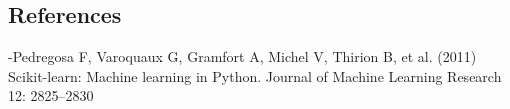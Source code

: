 \documentclass{article}
\begin{document}
\begin{multicols}{2}
\section{References}
-Pedregosa F, Varoquaux G, Gramfort A, Michel V, Thirion B, et al. (2011) Scikit-learn: Machine
learning in Python. Journal of Machine Learning Research 12: 2825–2830

\end{multicols}
\end{document}
